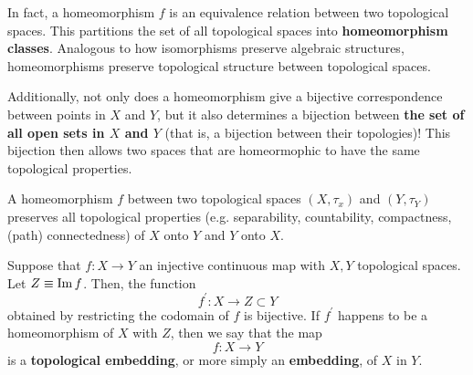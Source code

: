     In fact, a homeomorphism $f$ is an equivalence relation between two topological spaces. This partitions the set of all topological spaces into \textbf{homeomorphism classes}. Analogous to how isomorphisms preserve algebraic structures, homeomorphisms preserve topological structure between topological spaces. 

    Additionally, not only does a homeomorphism give a bijective correspondence between points in $X$ and $Y$, but it also determines a bijection between \textbf{the set of all open sets in $X$ and $Y$} (that is, a bijection between their topologies)! This bijection then allows two spaces that are homeormophic to have the same topological properties. 

    \begin{proposition}
      A homeomorphism $f$ between two topological spaces $(X, \tau_{x})$ and $(Y, \tau_{Y})$ preserves all topological properties (e.g. separability, countability, compactness, (path) connectedness) of $X$ onto $Y$ and $Y$ onto $X$. 
    \end{proposition}

    \begin{definition}
      Suppose that $f: X \longrightarrow Y$ an injective continuous map with $X, Y$ topological spaces. Let $Z \equiv \im{f}$. Then, the function
      \begin{equation}
        f^\prime: X \longrightarrow Z \subset Y
      \end{equation}
      obtained by restricting the codomain of $f$ is bijective. If $f^\prime$ happens to be a homeomorphism of $X$ with $Z$, then we say that the map
      \begin{equation}
        f: X \longrightarrow Y
      \end{equation}
      is a \textbf{topological embedding}, or more simply an \textbf{embedding}, of $X$ in $Y$. 
    \end{definition}

